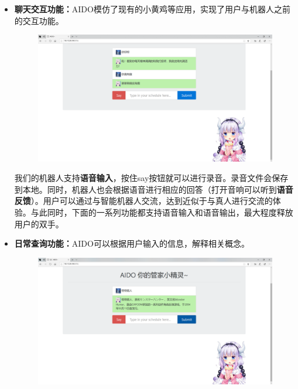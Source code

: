 \documentclass[logo,reportComp]{thesis}
\begin{document}
\begin{itemize}
\item \textbf{聊天交互功能：}AIDO模仿了现有的小黄鸡等应用，实现了用户与机器人之前的交互功能。
\begin{figure}[H]
\centering
\includegraphics[width=\linewidth]{fig/chatting}
\end{figure}

我们的机器人支持\textbf{语音输入}，按住say按钮就可以进行录音。录音文件会保存到本地。同时，机器人也会根据语音进行相应的回答（打开音响可以听到\textbf{语音反馈}）。用户可以通过与智能机器人交流，达到近似于与真人进行交流的体验。与此同时，下面的一系列功能都支持语音输入和语音输出，最大程度释放用户的双手。
\item \textbf{日常查询功能：}AIDO可以根据用户输入的信息，解释相关概念。
\begin{figure}[H]
\centering
\includegraphics[width=\linewidth]{fig/wiki}
\end{figure}


\end{itemize}
\end{document}
